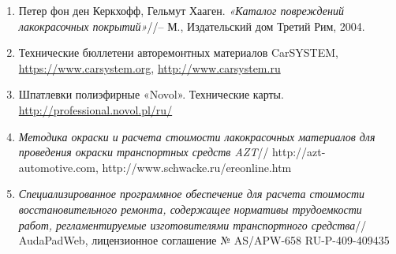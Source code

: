 \begin{enumerate}
\item Петер фон ден Керкхофф, Гельмут Хааген. \emph{«Каталог повреждений лакокрасочных покрытий»}//-- М., Издательский дом Третий Рим, 2004.
\item Технические бюллетени авторемонтных материалов CarSYSTEM, \url{https://www.carsystem.org}, \url{http://www.carsystem.ru}
%
\item Шпатлевки полиэфирные «Novol». Технические карты. \url{http://professional.novol.pl/ru/}
%
\item
\emph{Методика окраски и расчета стоимости лакокрасочных материалов для проведения окраски транспортных средств   AZT}// http://azt-automotive.com,   http://www.schwacke.ru/\-ereonline.htm

%
\item
\emph{Специализированное программное обеспечение для расчета стоимости  восстановительного ремонта, содержащее нормативы трудоемкости работ, регламентируемые изготовителями транспортного средства}//   AudaPadWeb, лицензионное соглашение № AS/APW-658  RU-P-409-409435

%



\end{enumerate}
